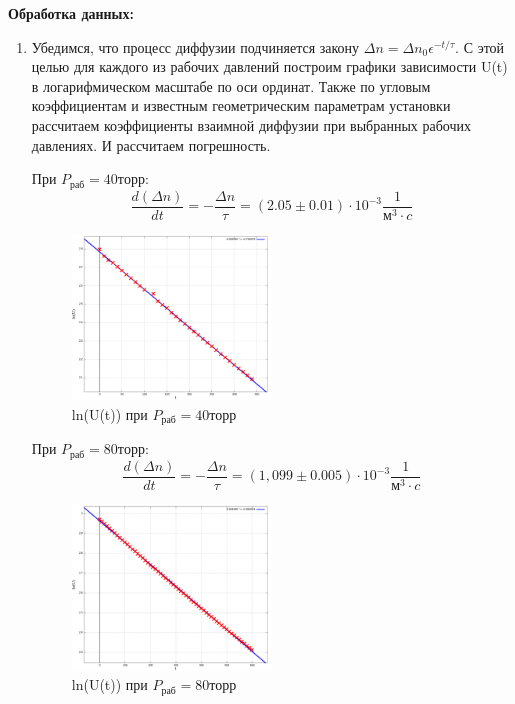 \documentclass[11pt]{article}
\begin{document}
\par \textbf{Обработка данных:}

\begin{enumerate}
    \item Убедимся, что процесс диффузии подчиняется закону $\Delta n = \Delta n_0 \epsilon^{-t/\tau}$. С этой целью для каждого из рабочих давлений построим графики зависимости U(t) в логарифмическом масштабе по оси ординат. Также по угловым коэффициентам и известным геометрическим параметрам установки рассчитаем коэффициенты взаимной диффузии при выбранных рабочих давлениях. И рассчитаем погрешность.

    \medskip
     
    При $P_{раб} = 40 торр$:
    \[\frac{d(\Delta n)}{dt} = - \frac{\Delta n}{ \tau} = (2.05 \pm 0.01) \cdot 10^{-3}\frac{1}{м^3 \cdot c}\]
    \begin{figure}[H]
    \centering
    \captionsetup{justification=centering}
    \includegraphics[width=0.5\textwidth]{1-log.res.png}
    \caption{ln(U(t)) при $P_{раб} = 40 торр$}
    \end{figure}

    \medskip
     
    При $P_{раб} = 80 торр$:
    \[\frac{d(\Delta n)}{dt} = - \frac{\Delta n}{ \tau} = (1,099 \pm 0.005) \cdot 10^{-3}\frac{1}{м^3 \cdot c}\]

    \begin{figure}[H]
    \centering
    \captionsetup{justification=centering}
    \includegraphics[width=0.5\textwidth]{2-log.res.png}
    \caption{ln(U(t)) при $P_{раб} = 80 торр$}
    \end{figure}


\end{enumerate}
\end{document}
